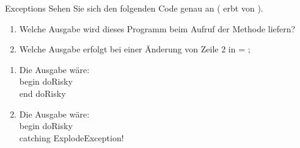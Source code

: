 \documentclass{../tuda-exercise}
\begin{document}
  \begin{task}[credit=\stars{1}{3}]{Exceptions}
    Sehen Sie sich den folgenden Code genau an ( erbt von
    ).

    \begin{enumerate}
      [label=(\arabic*)]
      \item Welche Ausgabe wird dieses Programm beim Aufruf der Methode  liefern?
      \item Welche Ausgabe erfolgt bei einer Änderung von Zeile \(2\) in  =
      \code{\textcolor{stringcolor}{"'yes"'}};
    \end{enumerate}

    

    \begin{solution}
      \begin{enumerate}
        [label=(\arabic*)]
        \item Die Ausgabe wäre:
        \\
        begin doRisky
        \\
        end doRisky
        \item Die Ausgabe wäre:
        \\
        begin doRisky
        \\
        catching ExplodeException!
      \end{enumerate}
    \end{solution}
  \end{task}
\end{document}
